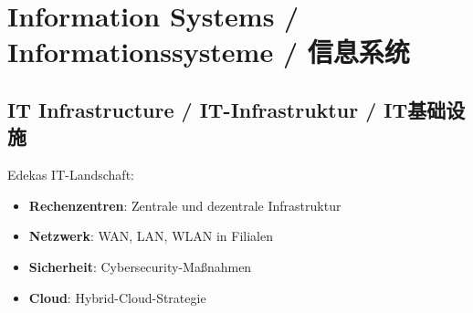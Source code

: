 \chapter{Information Systems / Informationssysteme / 信息系统}

\section{IT Infrastructure / IT-Infrastruktur / IT基础设施}

\begin{otherlanguage}{ngerman}
Edekas IT-Landschaft:
\begin{itemize}
    \item \textbf{Rechenzentren}: Zentrale und dezentrale Infrastruktur
    \item \textbf{Netzwerk}: WAN, LAN, WLAN in Filialen
    \item \textbf{Sicherheit}: Cybersecurity-Maßnahmen
    \item \textbf{Cloud}: Hybrid-Cloud-Strategie
\end{itemize}
\end{otherlanguage}

